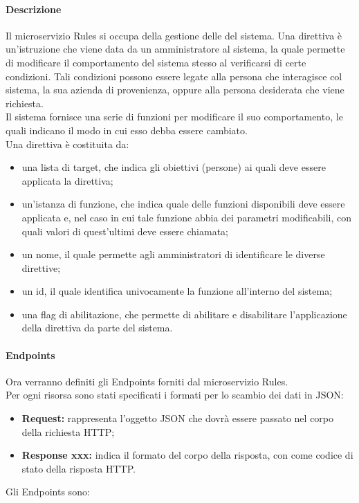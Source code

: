 \paragraph{Descrizione}
Il microservizio Rules si occupa della gestione delle  del sistema. Una direttiva è un'istruzione che viene data da un amministratore al sistema, la quale permette di modificare il comportamento del sistema stesso al verificarsi di certe condizioni. Tali condizioni possono essere legate alla persona che interagisce col sistema, la sua azienda di provenienza, oppure alla persona desiderata che viene richiesta.\\
Il sistema fornisce una serie di funzioni per modificare il suo comportamento, le quali indicano il modo in cui esso debba essere cambiato. \\
Una direttiva è costituita da:
\begin{itemize}
	\item una lista di target, che indica gli obiettivi (persone) ai quali deve essere applicata la direttiva;
	\item un'istanza di funzione, che indica quale delle funzioni disponibili deve essere applicata e, nel caso in cui tale funzione abbia dei parametri modificabili, con quali valori di quest'ultimi deve essere chiamata;
	\item un nome, il quale permette agli amministratori di identificare le diverse direttive;
	\item un id, il quale identifica univocamente la funzione all'interno del sistema;
	\item una flag di abilitazione, che permette di abilitare e disabilitare l'applicazione della direttiva da parte del sistema.
\end{itemize}

\paragraph{Endpoints}

Ora verranno definiti gli Endpoints forniti dal microservizio Rules.\\
Per ogni risorsa sono stati specificati i formati per lo scambio dei dati in JSON:
\begin{itemize}
\item \textbf{Request:} rappresenta l’oggetto JSON che dovrà essere passato nel corpo della richiesta HTTP;
\item \textbf{Response xxx:} indica il formato del corpo della risposta, con  come codice di stato della risposta HTTP.
\end{itemize}
Gli Endpoints sono:

